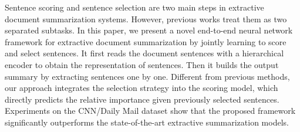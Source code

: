 Sentence scoring and sentence selection are two main steps in extractive document summarization systems. However, previous works treat them as two separated subtasks. In this paper, we present a novel end-to-end neural network framework for extractive document summarization by jointly learning to score and select sentences. It first reads the document sentences with a hierarchical encoder to obtain the representation of sentences. Then it builds the output summary by extracting sentences one by one. Different from previous methods, our approach integrates the selection strategy into the scoring model, which directly predicts the relative importance given previously selected sentences. Experiments on the CNN/Daily Mail dataset show that the proposed framework significantly outperforms the state-of-the-art extractive summarization models.
